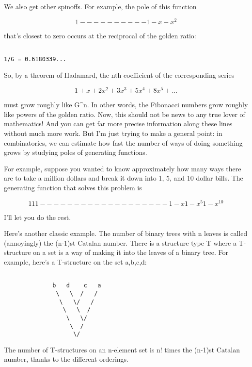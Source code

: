 We also get other spinoffs.  For example, the pole of this function


$$

     1
 ---------- 
 1 - x - x^{2}
$$
    
that's closest to zero occurs at the reciprocal of the golden ratio:


\begin{verbatim}

1/G = 0.6180339...
\end{verbatim}
    
So, by a theorem of Hadamard, the nth coefficient of the corresponding
series


$$

1 + x + 2x^{2} + 3x^{3} + 5x^{4} + 8x^{5} + ...
$$
    
must grow roughly like G^{n}.  In other words, the Fibonacci numbers grow
roughly like powers of the golden ratio.  Now, this should not be news
to any true lover of mathematics!  And you can get far more precise
information along these lines without much more work.  But I'm just
trying to make a general point: in combinatorics, we can estimate how
fast the number of ways of doing something grows by studying poles of
generating functions.

For example, suppose you wanted to know approximately how many ways
there are to take a million dollars and break it down into 1, 5, and
10 dollar bills.  The generating function that solves this problem is


$$

           1       1         1
         ------  ------   -------
         1 - x   1 - x^{5}   1 - x^{10}
$$
    
I'll let you do the rest.  

Here's another classic example.  The number of binary trees with n leaves 
is called (annoyingly) the (n-1)st Catalan number.  There is a structure
type T where a T-structure on a set is a way of making it into the
leaves of a binary tree.  For example, here's a T-structure on the set
{a,b,c,d}:


\begin{verbatim}

              b   d    c   a
               \   \  /   /
                \   \/   /
                 \   \  /           
                  \   \/
                   \  /
                    \/
\end{verbatim}
    
The number of T-structures on an n-element set is n! times the
(n-1)st Catalan number, thanks to the different orderings.

